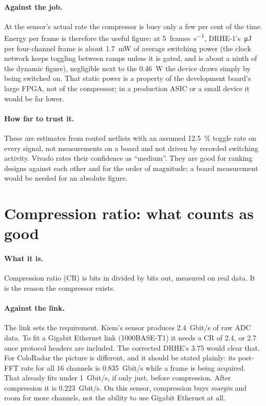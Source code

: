 \paragraph{Against the job.} At the sensor's actual rate the compressor is busy
only a few per cent of the time. Energy per frame is therefore the useful
figure: at \SI{5}{frames\per\second}, DRHE-1's \,\si{\micro\joule}
per four-channel frame is about \SI{1.7}{\milli\watt} of average switching power (the clock network
keeps toggling between ramps unless it is gated, and is about a ninth of the
dynamic figure),
negligible next to the \SI{0.46}{\watt} the device draws simply by being
switched on. That static power is a property of the development board's large
FPGA, not of the compressor; in a production ASIC or a small device it would be
far lower.

\paragraph{How far to trust it.} These are estimates from routed netlists with
an assumed \SI{12.5}{\percent} toggle rate on every signal, not measurements on
a board and not driven by recorded switching activity. Vivado rates their
confidence as ``medium''. They are good for ranking designs against each other
and for the order of magnitude; a board measurement would be needed for an
absolute figure.

\section{Compression ratio: what counts as good}
\label{sec:crinterp}

\paragraph{What it is.} Compression ratio (CR) is bits in divided by bits out,
measured on real data. It is the reason the compressor exists.

\paragraph{Against the link.} The link sets the requirement. Kiem's sensor
produces \SI{2.4}{Gbit/s} of raw ADC data. To fit a Gigabit Ethernet link
(1000BASE-T1) it needs a CR of 2.4, or 2.7 once protocol headers are included.
The corrected DRHE's 3.75 would clear that. For ColoRadar the picture is
different, and it should be stated plainly: its post-FFT rate for all 16
channels is \SI{0.835}{Gbit/s} while a frame is being acquired. That already
fits under \SI{1}{Gbit/s}, if only just, before compression. After compression
it is \SI{0.223}{Gbit/s}. On this sensor, compression buys \emph{margin} and
room for more channels, not the ability to use Gigabit Ethernet at all.

